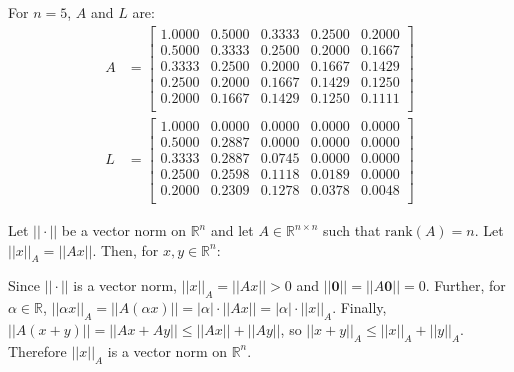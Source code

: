 \documentclass{article}
\begin{document}
For $n = 5$, $A$ and $L$ are:
\begin{align*}
    A & = \begin{bmatrix}
        1.0000 & 0.5000 & 0.3333 & 0.2500 & 0.2000 \\
        0.5000 & 0.3333 & 0.2500 & 0.2000 & 0.1667 \\
        0.3333 & 0.2500 & 0.2000 & 0.1667 & 0.1429 \\
        0.2500 & 0.2000 & 0.1667 & 0.1429 & 0.1250 \\
        0.2000 & 0.1667 & 0.1429 & 0.1250 & 0.1111 \\
    \end{bmatrix} \\
    L & = \begin{bmatrix}
        1.0000 & 0.0000 & 0.0000 & 0.0000 & 0.0000 \\
        0.5000 & 0.2887 & 0.0000 & 0.0000 & 0.0000 \\
        0.3333 & 0.2887 & 0.0745 & 0.0000 & 0.0000 \\
        0.2500 & 0.2598 & 0.1118 & 0.0189 & 0.0000 \\
        0.2000 & 0.2309 & 0.1278 & 0.0378 & 0.0048 \\
    \end{bmatrix}
\end{align*}

\clearpage

\problem{}
Let $||\cdot||$ be a vector norm on $\mathbb{R}^n$ and let $A \in \mathbb{R}^{n\times n}$ such that $\mathrm{rank}(A) = n$. Let $||x||_A = ||Ax||$. Then, for $x, y \in \mathbb{R}^n$:

Since $|| \cdot ||$ is a vector norm, $||x||_A = ||Ax|| > 0$ and $||\mathbf{0}|| = ||A \mathbf{0}|| = 0$. Further, for $\alpha \in \mathbb{R}$, $||\alpha x||_A = ||A(\alpha x)|| = |\alpha| \cdot ||Ax|| = |\alpha| \cdot ||x||_A$. Finally, $||A(x + y)|| = ||Ax + Ay|| \leq ||Ax|| + ||Ay||$, so $||x + y||_A \leq ||x||_A + ||y||_A$. Therefore $||x||_A$ is a vector norm on $\mathbb{R}^n$.

\clearpage
\end{document}
